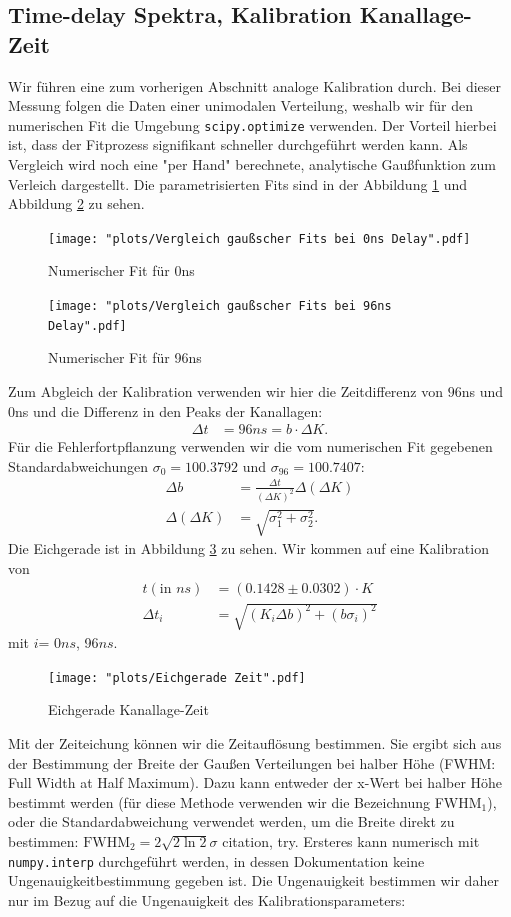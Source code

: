 \documentclass[%
aps,
onecolumn,
11pt,
tightenlines,
nofootinbib,
superscriptaddress,
floatfix,
prd,
]{revtex4-2}
\begin{document}
\subsection{Time-delay Spektra, Kalibration Kanallage-Zeit}
Wir führen eine zum vorherigen Abschnitt analoge Kalibration durch. Bei dieser Messung folgen die Daten einer unimodalen Verteilung, weshalb wir für den numerischen Fit die Umgebung \texttt{scipy.optimize} verwenden. Der Vorteil hierbei ist, dass der Fitprozess signifikant schneller durchgeführt werden kann. Als Vergleich wird noch eine "per Hand" berechnete, analytische Gaußfunktion zum Verleich dargestellt. Die parametrisierten Fits sind in der Abbildung \ref{fig:timedelay} und Abbildung \ref{fig:timedelay96} zu sehen. 
\begin{figure}[H]
	\centering
	\texttt{[image: "plots/Vergleich gaußscher Fits bei 0ns Delay".pdf]}
	\caption{Numerischer Fit für 0ns}
	\label{fig:timedelay}
\end{figure}
\begin{figure}[H]
	\centering
	\texttt{[image: "plots/Vergleich gaußscher Fits bei 96ns Delay".pdf]}
	\caption{Numerischer Fit für 96ns}
	\label{fig:timedelay96}
\end{figure}
Zum Abgleich der Kalibration verwenden wir hier die Zeitdifferenz von $96$ns und $0$ns und die Differenz in den Peaks der Kanallagen:
\begin{align}
	\Delta t &= 96ns = b \cdot \Delta K. 
\end{align}
Für die Fehlerfortpflanzung verwenden wir die vom numerischen Fit gegebenen Standardabweichungen $\sigma_{0}=100.3792$ und $\sigma_{96}= 100.7407$:
\begin{align}
    \Delta b &= \frac{\Delta t}{(\Delta K)^2} \Delta(\Delta K) \\
    \Delta (\Delta K) &= \sqrt{ \sigma_1^2 + \sigma_2^2 }.
\end{align}
Die Eichgerade ist in Abbildung \ref{fig:timecalibrate} zu sehen. Wir kommen auf eine Kalibration von
\begin{align}
	t (\text{in $ns$})&= (0.1428 \pm 0.0302) \cdot K \\
	\Delta t_{i} &= \sqrt{ (K_i \Delta b)^2 + (b \sigma_i)^2 }
\end{align}
mit $i $= 0$ns$, 96$ns$.
\begin{figure}[H]
	\centering
	\texttt{[image: "plots/Eichgerade Zeit".pdf]}
	\caption{Eichgerade Kanallage-Zeit}
	\label{fig:timecalibrate}
\end{figure}
Mit der Zeiteichung können wir die Zeitauflösung bestimmen. Sie ergibt sich aus der Bestimmung der Breite der Gaußen Verteilungen bei halber Höhe (FWHM: Full Width at Half Maximum). Dazu kann entweder der x-Wert bei halber Höhe bestimmt werden (für diese Methode verwenden wir die Bezeichnung FWHM$_{1}$), oder die Standardabweichung verwendet werden, um die Breite direkt zu bestimmen: $\text{FWHM}_{2} =2 \sqrt{2\ln 2}\sigma $ {\color{red} citation, try}. Ersteres kann numerisch mit \texttt{numpy.interp} durchgeführt werden, in dessen Dokumentation keine Ungenauigkeitbestimmung gegeben ist. Die Ungenauigkeit bestimmen wir daher nur im Bezug auf die Ungenauigkeit des Kalibrationsparameters:
\end{document}
